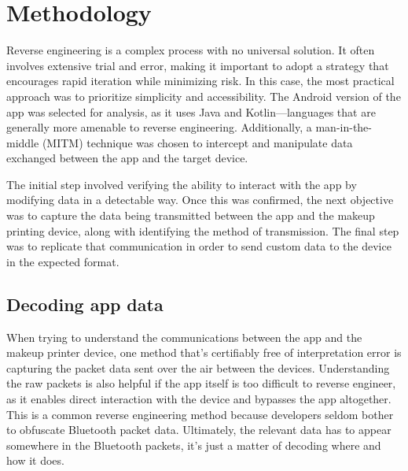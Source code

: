 \chapter{Methodology}
Reverse engineering is a complex process with no universal solution. It often involves extensive trial and error, making it important to adopt a strategy that encourages rapid iteration while minimizing risk. In this case, the most practical approach was to prioritize simplicity and accessibility. The Android version of the app was selected for analysis, as it uses Java and Kotlin—languages that are generally more amenable to reverse engineering. Additionally, a man-in-the-middle (MITM) technique was chosen to intercept and manipulate data exchanged between the app and the target device.

The initial step involved verifying the ability to interact with the app by modifying data in a detectable way. Once this was confirmed, the next objective was to capture the data being transmitted between the app and the makeup printing device, along with identifying the method of transmission. The final step was to replicate that communication in order to send custom data to the device in the expected format.

\section{Decoding app data}
When trying to understand the communications between the app and the makeup printer device, one method that’s certifiably free of interpretation error is capturing the packet data sent over the air between the devices. Understanding the raw packets is also helpful if the app itself is too difficult to reverse engineer, as it enables direct interaction with the device and bypasses the app altogether. This is a common reverse engineering method because developers seldom bother to obfuscate Bluetooth packet data. Ultimately, the relevant data has to appear somewhere in the Bluetooth packets, it’s just a matter of decoding where and how it does.

